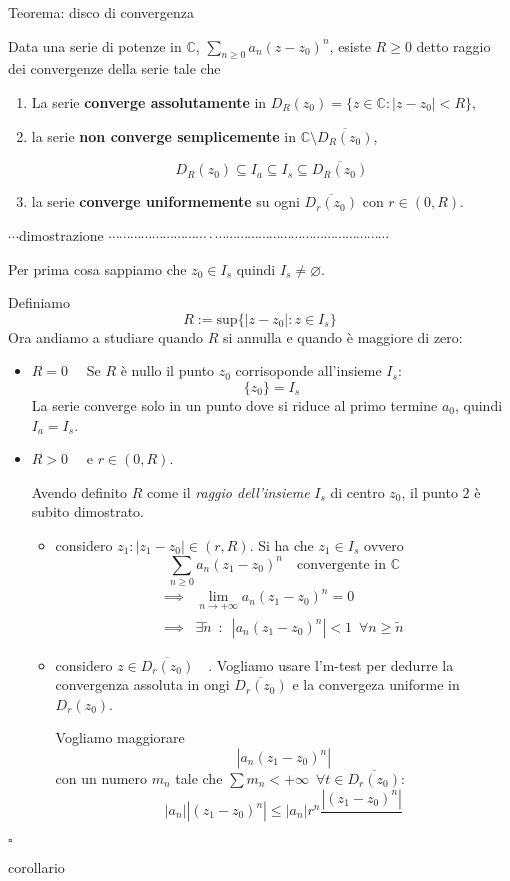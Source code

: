 \documentclass[x11names]{article}
\newcommand*{\QEDB}{\null\nobreak\hfill\ensuremath{\square}}%
\newcommand{\teorema}[2]{
	\begin{center}
		\fboxsep11pt
		\colorbox{myred}{\begin{minipage}{5.75in}
				\begin{redes}{#1}
					#2
				\end{redes}
		\end{minipage}}
	\end{center}
}
\newcommand{\dimostrazione}[2]{
	\begin{dym}{\(\cdots\)dimostrazione#1 \(\cdots \cdots \cdots \cdots \cdots \cdots \cdots \cdots \cdots\cdot\cdots\cdots\cdots\cdots\cdots\cdots\cdots\cdots\cdots\cdots\cdots\cdots\cdots\cdots\cdots\cdots\)}
		#2
		\QEDB
	\end{dym}
}
\newcommand{\corollario}[2]{
	\begin{center}
		\begin{coroll}{corollario#1}
			#2
		\end{coroll}
	\end{center}
}
\begin{document}
\teorema{Teorema: disco di convergenza}{
Data una serie di potenze in \(\mathbb{C}\), \(\sum_{n\geq 0} a_{n}(z- z_{0})^n\), esiste \(R\geq 0\) detto raggio dei convergenze della serie tale che
\begin{enumerate}
	\item La serie \textbf{converge assolutamente} in \(D_{R}(z_{0}) = \{z\in \mathbb{C} : |z-z_{0}| < R\}\),
	\item la serie \textbf{non converge semplicemente} in \(\mathbb{C} \setminus \overline{D_{R}(z_{0})}\),
	
	\[ 
	D_{R}(z_{0}) \subseteq I_{a} \subseteq I_{s} \subseteq \overline{D_{R}(z_{0})}
	\]
	
	\item la serie \textbf{converge uniformemente} su ogni \(\overline{D_{r}(z_{0})}\) con \(r \in (0,R)\).
\end{enumerate}
}
\dimostrazione{}{
Per prima cosa sappiamo che \(z_{0} \in I_{s}\) quindi \(I_{s} \neq \varnothing\).

Definiamo 
\[ 
R := \text{sup}\{|z-z_{0}| : z \in I_{s}\}
\]
Ora andiamo a studiare quando \(R\) si annulla e quando è maggiore di zero:
\begin{itemize}
	\item \(\boxed{R = 0} \quad\) Se \(R\) è nullo il punto \(z_{0}\) corrisoponde all'insieme \(I_{s}\): 
	\[ 
	\{z_{0}\} = I_{s}
	\]
	La serie converge solo in un punto dove si riduce al primo termine \(a_{0}\), quindi \(I_{a} = I_{s}\).
	\item \(\boxed{R > 0} \quad\) e \(r \in (0,R)\).
	
	Avendo definito \(R\) come il \textit{raggio dell'insieme} \(I_{s}\) di centro \(z_{0}\), il punto \(2\) è subito dimostrato.
	
	\begin{itemize}
		\item considero \(\boxed{z_{1}:|z_{1} - z_{0}| \in (r,R)}\). Si ha che \(z_{1} \in I_{s}\) ovvero
		\[ 
		\sum_{n\geq 0} a_{n}(z_{1}-z_{0})^n \quad \text{convergente in } \mathbb{C}
		\]
		\begin{align*}
			\implies& \lim_{n\to +\infty}a_{n}(z_{1}-z_{0})^n = 0 \\ 
			\implies& \exists\tilde{n} \;\ : \;\ |a_{n}(z_{1}-z_{0})^n| < 1 \;\ \forall n \geq \tilde{n}
		\end{align*}
		
		\item considero \(\boxed{z \in \overline{D_{r}(z_{0})}} \quad\). Vogliamo usare l'm-test per dedurre la convergenza assoluta in ongi \(\overline{D_{r}(z_{0})}\) e la convergeza uniforme in \(D_{r}(z_{0})\).
		
		Vogliamo maggiorare
		\[ 
		|a_{n}(z_{1}-z_{0})^n|
		\]
		con un numero \(m_{n}\) tale che \(\sum m_{n} < +\infty \;\ \forall t \in \overline{D_{r}(z_{0})}\):
		\[ 
		|a_{n}||(z_{1}-z_{0})^n| \leq |a_{n}|r^n\frac{|(z_{1}-z_{0})^n|}{}
		\]
	\end{itemize}
\end{itemize}
}
\corollario{}{

}
	
\end{document}
